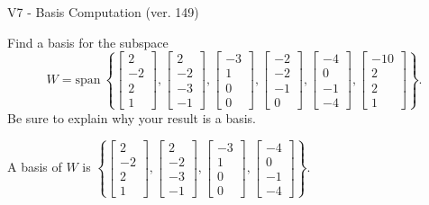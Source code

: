 \begin{exercise}
  \begin{exerciseTitle}V7 - Basis Computation (ver. 149)\end{exerciseTitle}
  \begin{exerciseStatement}
    Find a basis for the subspace 
\[W=\mathrm{span}\ \left\{\left[\begin{array}{r}
2 \\
-2 \\
2 \\
1
\end{array}\right] , \left[\begin{array}{r}
2 \\
-2 \\
-3 \\
-1
\end{array}\right] , \left[\begin{array}{r}
-3 \\
1 \\
0 \\
0
\end{array}\right] , \left[\begin{array}{r}
-2 \\
-2 \\
-1 \\
0
\end{array}\right] , \left[\begin{array}{r}
-4 \\
0 \\
-1 \\
-4
\end{array}\right] , \left[\begin{array}{r}
-10 \\
2 \\
2 \\
1
\end{array}\right]\right\}.\]
 Be sure to explain why your result is a basis.


  \end{exerciseStatement}
  \begin{exerciseAnswer}
   A basis of \(W\) is  \(\left\{\left[\begin{array}{r}
2 \\
-2 \\
2 \\
1
\end{array}\right] , \left[\begin{array}{r}
2 \\
-2 \\
-3 \\
-1
\end{array}\right] , \left[\begin{array}{r}
-3 \\
1 \\
0 \\
0
\end{array}\right] , \left[\begin{array}{r}
-4 \\
0 \\
-1 \\
-4
\end{array}\right]\right\}\).
  


  \end{exerciseAnswer}
\end{exercise}